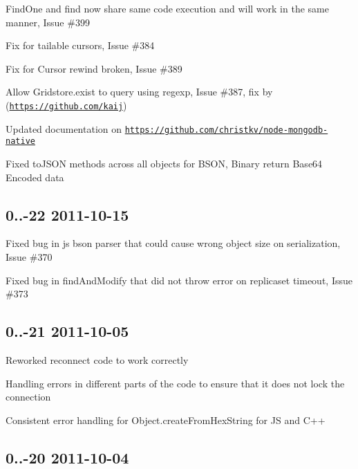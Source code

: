 \begin{DoxyItemize}
\item Find\+One and find now share same code execution and will work in the same manner, Issue \#399
\item Fix for tailable cursors, Issue \#384
\item Fix for Cursor rewind broken, Issue \#389
\item Allow Gridstore.\+exist to query using regexp, Issue \#387, fix by (\href{https://github.com/kaij}{\tt https\+://github.\+com/kaij})
\item Updated documentation on \href{https://github.com/christkv/node-mongodb-native}{\tt https\+://github.\+com/christkv/node-\/mongodb-\/native}
\item Fixed to\+J\+S\+ON methods across all objects for B\+S\+ON, Binary return Base64 Encoded data
\end{DoxyItemize}

\subsection*{0..-\/22 2011-\/10-\/15 }


\begin{DoxyItemize}
\item Fixed bug in js bson parser that could cause wrong object size on serialization, Issue \#370
\item Fixed bug in find\+And\+Modify that did not throw error on replicaset timeout, Issue \#373
\end{DoxyItemize}

\subsection*{0..-\/21 2011-\/10-\/05 }


\begin{DoxyItemize}
\item Reworked reconnect code to work correctly
\item Handling errors in different parts of the code to ensure that it does not lock the connection
\item Consistent error handling for Object.\+create\+From\+Hex\+String for JS and C++
\end{DoxyItemize}

\subsection*{0..-\/20 2011-\/10-\/04 }


